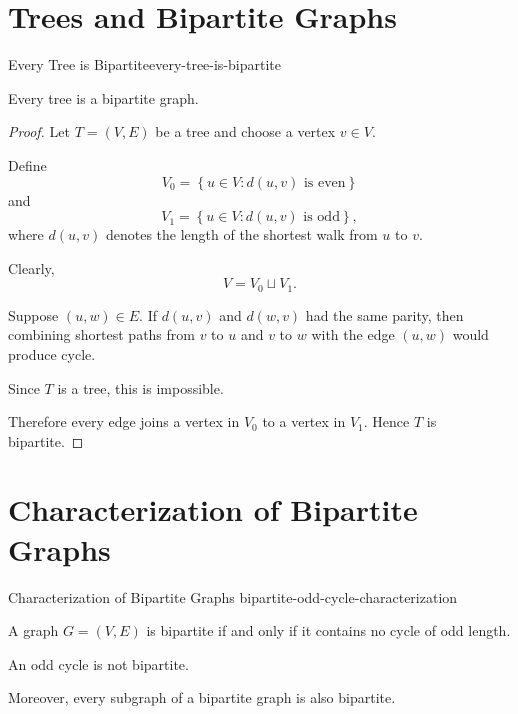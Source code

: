 \section{Trees and Bipartite Graphs}

\begin{theorem}{Every Tree is Bipartite}{every-tree-is-bipartite}

Every tree is a bipartite graph.

\end{theorem}


\begin{proof}

Let
\(
T=(V,E)
\)
be a tree and choose a vertex
\(
v\in V.
\)

Define
\[
V_0
=
\left\{
u\in V:
d(u,v)\text{ is even}
\right\}
\]
and
\[
V_1
=
\left\{
u\in V:
d(u,v)\text{ is odd}
\right\},
\]
where $d(u,v)$ denotes the length of the shortest walk from $u$ to
$v$.

Clearly,
\[
V=V_0\sqcup V_1.
\]

Suppose $(u,w)\in E$. If $d(u,v)$ and $d(w,v)$ had the same parity,
then combining shortest paths from $v$ to $u$ and $v$ to $w$ with the
edge $(u,w)$ would produce cycle.

Since $T$ is a tree, this is impossible.

Therefore every edge joins a vertex in $V_0$ to a vertex in $V_1$.
Hence $T$ is bipartite.

\end{proof}


\section{Characterization of Bipartite Graphs}

\begin{theorem}{Characterization of Bipartite Graphs}
{bipartite-odd-cycle-characterization}

A graph
\(
G=(V,E)
\)
is bipartite if and only if it contains no cycle of odd length.

\end{theorem}


\begin{remark}

An odd cycle is not bipartite.

Moreover, every subgraph of a bipartite graph is also bipartite.

\end{remark}


